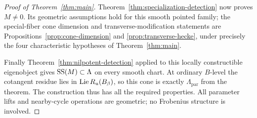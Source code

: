 \begin{proof}[Proof of Theorem~\ref{thm:main}]
Theorem~\ref{thm:specialization-detection} now proves $M\ne0$.
Its geometric assumptions hold for this smooth pointed family;
the special-fiber cone dimension and transverse-modification
statements are Propositions~\ref{prop:cone-dimension} and
\ref{prop:transverse-hecke}, under precisely the four characteristic
hypotheses of Theorem~\ref{thm:main}.

Finally Theorem~\ref{thm:nilpotent-detection} applied to this locally
constructible eigenobject gives $\operatorname{SS}(M)\subset\Lambda$ on every
smooth chart.  At ordinary $B$-level the cotangent residue lies in
$\operatorname{Lie} R_u(B_\beta)$, so this cone is exactly $\Lambda_{\mathrm{par}}$
from the theorem.  The construction thus has all the required
properties.  All parameter lifts and nearby-cycle operations are
geometric; no Frobenius structure is involved.
\end{proof}
